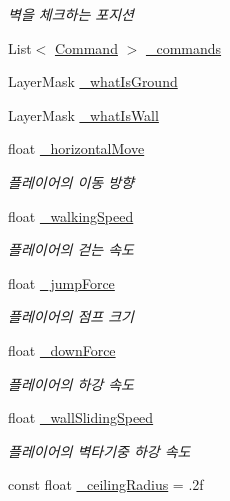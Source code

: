 \begin{DoxyCompactItemize}
\begin{DoxyCompactList}\small\item\em 벽을 체크하는 포지션 \end{DoxyCompactList}\item 
List$<$ \mbox{\hyperlink{class_command}{Command}} $>$ \mbox{\hyperlink{class_player_controller_aab899fbdea369867174253d2efd978fe}{\+\_\+commands}}
\item 
Layer\+Mask \mbox{\hyperlink{class_player_controller_a9e49eccbc78237a2355490b7df08368d}{\+\_\+what\+Is\+Ground}}
\item 
Layer\+Mask \mbox{\hyperlink{class_player_controller_a00e0ccedea38a9796587bcfc765d193e}{\+\_\+what\+Is\+Wall}}
\item 
float \mbox{\hyperlink{class_player_controller_af8d3915645f93ede0aaedfdd343c33d1}{\+\_\+horizontal\+Move}}
\begin{DoxyCompactList}\small\item\em 플레이어의 이동 방향 \end{DoxyCompactList}\item 
float \mbox{\hyperlink{class_player_controller_a1ab6a7892eecf1a9fa7b1a49842a3dd2}{\+\_\+walking\+Speed}}
\begin{DoxyCompactList}\small\item\em 플레이어의 걷는 속도 \end{DoxyCompactList}\item 
float \mbox{\hyperlink{class_player_controller_aaec5e4333fe1c532900ca666c075261c}{\+\_\+jump\+Force}}
\begin{DoxyCompactList}\small\item\em 플레이어의 점프 크기 \end{DoxyCompactList}\item 
float \mbox{\hyperlink{class_player_controller_a5a14806a0a5b00eb0fc55e071cc0bfc1}{\+\_\+down\+Force}}
\begin{DoxyCompactList}\small\item\em 플레이어의 하강 속도 \end{DoxyCompactList}\item 
float \mbox{\hyperlink{class_player_controller_a20e9c123deaac078932a4def658c20bb}{\+\_\+wall\+Sliding\+Speed}}
\begin{DoxyCompactList}\small\item\em 플레이어의 벽타기중 하강 속도 \end{DoxyCompactList}\item 
const float \mbox{\hyperlink{class_player_controller_a899075705a92c6e4831dc3276dcaebcf}{\+\_\+ceiling\+Radius}} = .\+2f

\end{DoxyCompactItemize}
